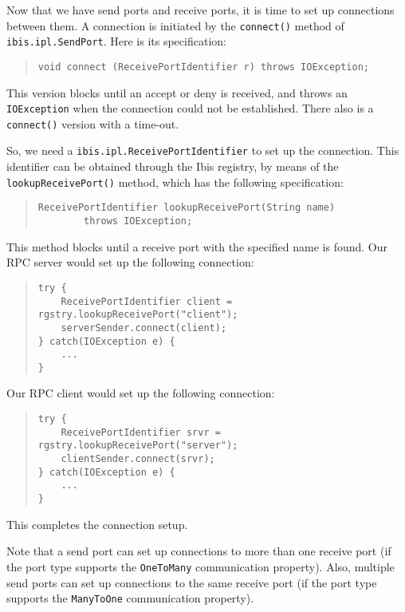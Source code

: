 \documentclass[10pt]{article}
\begin{document}
Now that we have send ports and receive ports, it is time to set up
connections between them.
A connection is initiated by the \texttt{connect()} method of
\texttt{ibis.ipl.SendPort}.
Here is its specification:

\begin{quote}
\begin{verbatim}
void connect (ReceivePortIdentifier r) throws IOException;
\end{verbatim}
\end{quote}

\noindent
This version blocks until an accept or deny is received, and throws
an \texttt{IOException} when the connection could not be established.
There also is a \texttt{connect()} version with a time-out.

So, we need a \texttt{ibis.ipl.ReceivePortIdentifier} to set up the
connection.
This identifier can be obtained through the Ibis registry, by
means of the \texttt{lookupReceivePort()} method, which has the following specification:

\begin{quote}
\begin{verbatim}
ReceivePortIdentifier lookupReceivePort(String name)
        throws IOException;
\end{verbatim}
\end{quote}
\noindent
This method blocks until a receive port with the specified name is found.
Our RPC server would set up the following connection:

\begin{quote}
\begin{verbatim}
try {
    ReceivePortIdentifier client = rgstry.lookupReceivePort("client");
    serverSender.connect(client);
} catch(IOException e) {
    ...
}
\end{verbatim}
\end{quote}

\noindent
Our RPC client would set up the following connection:

\begin{quote}
\begin{verbatim}
try {
    ReceivePortIdentifier srvr = rgstry.lookupReceivePort("server");
    clientSender.connect(srvr);
} catch(IOException e) {
    ...
}
\end{verbatim}
\end{quote}

This completes the connection setup.

Note that a send port can set up connections to more than one
receive port (if the port type supports the \texttt{OneToMany}
communication property). Also, multiple send ports can set up
connections to the same receive port (if the port type supports
the \texttt{ManyToOne} communication property).
\end{document}
